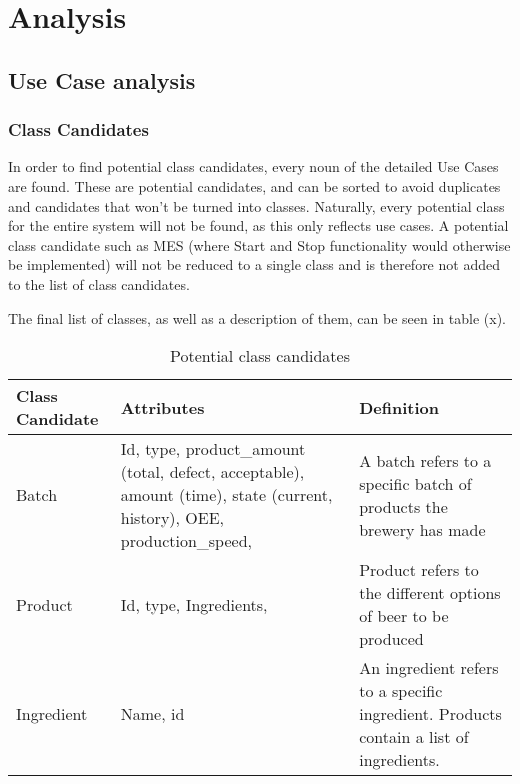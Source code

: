 \section{Analysis}

\subsection{Use Case analysis}

\subsubsection{Class Candidates}
In order to find potential class candidates, every noun of the detailed Use Cases are found.
These are potential candidates, and can be sorted to avoid duplicates and candidates that 
won’t be turned into classes. Naturally, every potential class for the entire system will 
not be found, as this only reflects use cases. A potential class candidate such as MES 
(where Start and Stop functionality would otherwise be implemented) will not be reduced to 
a single class and is therefore not added to the list of class candidates.

The final list of classes, as well as a description of them, can be seen in table (x).

\begin{table}[ht]
    \begin{tabularx}{\textwidth}{|>{\RaggedRight}p{3cm}|>{\RaggedRight}p{6cm}|>{\RaggedRight}X|}
    \hline
    \textbf{Class Candidate} & \textbf{Attributes}                                                                                                     & \textbf{Definition}                                                                    \\ \hline
    Batch                    & Id, type, product\_amount (total, defect, acceptable), amount (time), state (current, history), OEE, production\_speed, & A batch refers to a specific batch of products the brewery has made                    \\ \hline
    Product                  & Id, type, Ingredients,                                                                                                  & Product refers to the different options of beer to be produced                         \\ \hline
    Ingredient               & Name, id                                                                                                                & An ingredient refers to a specific ingredient. Products contain a list of ingredients. \\ \hline
    \end{tabularx}
    \caption{Potential class candidates}
    \label{table:class_candidates}
    \end{table}

